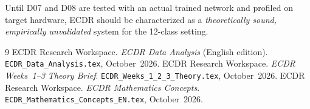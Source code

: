 \documentclass[11pt, a4paper]{article}
\theoremstyle{definition}
\theoremstyle{plain}
\newcommand{\code}[1]{\texttt{#1}}
\begin{document}
\noindent Until D07 and D08 are tested with an actual trained network and profiled
on target hardware, ECDR should be characterized as a \emph{theoretically sound,
empirically unvalidated} system for the 12-class setting.

\begin{thebibliography}{9}
  ECDR Research Workspace. \textit{ECDR Data Analysis} (English edition).
  \code{ECDR\_Data\_Analysis.tex}, October~2026.
  ECDR Research Workspace. \textit{ECDR Weeks~1--3 Theory Brief}.
  \code{ECDR\_Weeks\_1\_2\_3\_Theory.tex}, October~2026.
  ECDR Research Workspace. \textit{ECDR Mathematics Concepts}.
  \code{ECDR\_Mathematics\_Concepts\_EN.tex}, October~2026.
\end{thebibliography}
\end{document}
